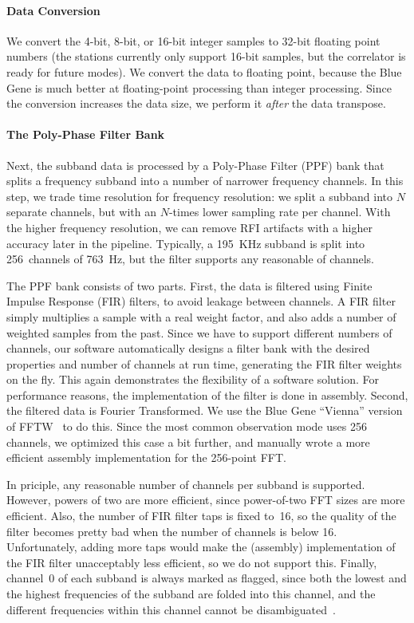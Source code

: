 \paragraph{Data Conversion}
We convert the 4-bit, 8-bit, or 16-bit integer samples to 32-bit
floating point numbers (the stations currently only support 16-bit samples,
but the correlator is ready for future modes).
We convert the data to floating point, because the Blue Gene is much better at
floating-point processing than integer processing.
Since the conversion increases the data size, we perform it \emph{after\/} the
data transpose.


\paragraph{The Poly-Phase Filter Bank }
Next, the subband data is processed by a Poly-Phase Filter (PPF) bank that
splits a frequency subband into a number of narrower frequency channels.
In this step, we trade time resolution for frequency resolution: we split a
subband into $N$ separate channels, but with an $N$-times lower sampling rate
per channel.
With the higher frequency resolution, we can remove RFI artifacts with a
higher accuracy later in the pipeline.
Typically, a 195~KHz subband is split into 256~channels of 763~Hz, but the
filter supports any reasonable of channels.

The PPF bank consists of two parts.
First, the data is filtered using Finite Impulse Response (FIR) filters,
to avoid leakage between channels.
A FIR filter simply multiplies a sample with a real weight factor, and
also adds a number of weighted samples from the past.
Since we have to support different numbers of channels, our software
automatically designs a filter bank with the desired properties and number
of channels at run time, generating the FIR filter weights on the fly.
This again demonstrates the flexibility of a software solution.
For performance reasons, the implementation of the filter is done in assembly.
Second, the filtered data is Fourier Transformed.
We use the Blue Gene ``Vienna'' version of FFTW~\cite{Lorenz:05} to do this.
Since the most common observation mode uses 256 channels, we optimized this
case a bit further, and manually wrote a more efficient assembly
implementation for the 256-point FFT.

In priciple, any reasonable number of channels per subband is supported.
However, powers of two are more efficient, since power-of-two FFT sizes
are more efficient.
Also, the number of FIR filter taps is fixed to~16, so the quality of the
filter becomes pretty bad when the number of channels is below 16.
Unfortunately, adding more taps would make the (assembly) implementation
of the FIR filter unacceptably less efficient, so we do not support this.
Finally, channel~0 of each subband is always marked as flagged, since both
the lowest and the highest frequencies of the subband are folded into this
channel, and the different frequencies within this channel cannot be
disambiguated~\cite{Romein:08}.



